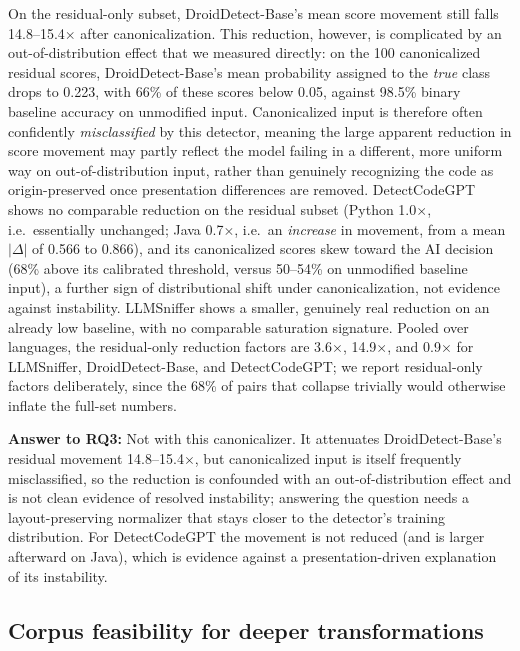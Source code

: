 \documentclass[sigconf,review,anonymous]{acmart}
\begin{document}
On the residual-only subset, DroidDetect-Base's mean score movement still falls 14.8--15.4$\times$ after canonicalization. This reduction, however, is complicated by an out-of-distribution effect that we measured directly: on the 100 canonicalized residual scores, DroidDetect-Base's mean probability assigned to the \emph{true} class drops to 0.223, with 66\% of these scores below 0.05, against 98.5\% binary baseline accuracy on unmodified input. Canonicalized input is therefore often confidently \emph{misclassified} by this detector, meaning the large apparent reduction in score movement may partly reflect the model failing in a different, more uniform way on out-of-distribution input, rather than genuinely recognizing the code as origin-preserved once presentation differences are removed. DetectCodeGPT shows no comparable reduction on the residual subset (Python 1.0$\times$, i.e.\ essentially unchanged; Java 0.7$\times$, i.e.\ an \emph{increase} in movement, from a mean $|\Delta|$ of 0.566 to 0.866), and its canonicalized scores skew toward the AI decision (68\% above its calibrated threshold, versus 50--54\% on unmodified baseline input), a further sign of distributional shift under canonicalization, not evidence against instability. LLMSniffer shows a smaller, genuinely real reduction on an already low baseline, with no comparable saturation signature. Pooled over languages, the residual-only reduction factors are 3.6$\times$, 14.9$\times$, and 0.9$\times$ for LLMSniffer, DroidDetect-Base, and DetectCodeGPT; we report residual-only factors deliberately, since the 68\% of pairs that collapse trivially would otherwise inflate the full-set numbers.


\par\addvspace{4pt}\noindent\colorbox{shadecolor}{\parbox{\dimexpr\columnwidth-2\fboxsep\relax}{%
\textbf{Answer to RQ3:} Not with this canonicalizer. It attenuates DroidDetect-Base's residual movement 14.8--15.4$\times$, but canonicalized input is itself frequently misclassified, so the reduction is confounded with an out-of-distribution effect and is not clean evidence of resolved instability; answering the question needs a layout-preserving normalizer that stays closer to the detector's training distribution. For DetectCodeGPT the movement is not reduced (and is larger afterward on Java), which is evidence against a presentation-driven explanation of its instability.
}}\par\addvspace{4pt}

\subsection{Corpus feasibility for deeper transformations}
\end{document}
